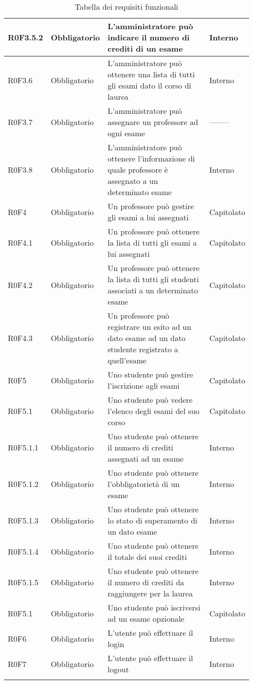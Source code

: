 \documentclass[AnalisiDeiRequisiti.tex]{subfiles}
\begin{document}
\begin{longtable}[H]{|p{2.5cm}|p{2.5cm}|p{5cm}|p{2cm}|}
	R0F3.5.2 & Obbligatorio & L'amministratore può indicare il numero di crediti di un esame & Interno \\ \hline
	R0F3.6 & Obbligatorio & L'amministratore può ottenere una lista di tutti gli esami dato il corso di laurea & Interno \\ \hline
	R0F3.7 & Obbligatorio & L'amministratore può assegnare un professore ad ogni esame & -------- \\ \hline %
	R0F3.8 & Obbligatorio & L'amministratore può ottenere l'informazione di quale professore è assegnato a un determinato esame & Interno \\ \hline
	R0F4 & Obbligatorio & Un professore può gestire gli esami a lui assegnati & Capitolato \\ \hline
	R0F4.1 & Obbligatorio & Un professore può ottenere la lista di tutti gli esami a lui assegnati & Capitolato \\ \hline
	R0F4.2 & Obbligatorio & Un professore può ottenere la lista di tutti gli studenti associati a un determinato esame & Capitolato \\ \hline
	R0F4.3 & Obbligatorio & Un professore può registrare un esito ad un dato esame ad un dato studente registrato a quell'esame & Capitolato \\ \hline
	R0F5 & Obbligatorio & Uno studente può gestire l'iscrizione agli esami & Capitolato \\ \hline
	R0F5.1 & Obbligatorio & Uno studente può vedere l'elenco degli esami del suo corso & Capitolato \\ \hline
	R0F5.1.1 & Obbligatorio & Uno studente può ottenere il numero di crediti assegnati ad un esame & Interno \\ \hline
	R0F5.1.2 & Obbligatorio & Uno studente può ottenere l'obbligatorietà di un esame & Interno \\ \hline
	R0F5.1.3 & Obbligatorio & Uno studente può ottenere lo stato di superamento di un dato esame & Interno \\ \hline
	R0F5.1.4 & Obbligatorio & Uno studente può ottenere il totale dei suoi crediti & Interno \\ \hline
	R0F5.1.5 & Obbligatorio & Uno studente può ottenere il numero di crediti da raggiungere per la laurea & Interno \\ \hline
	R0F5.1 & Obbligatorio & Uno studente può iscriversi ad un esame opzionale & Capitolato \\ \hline
	R0F6 & Obbligatorio & L'utente può effettuare il login & Interno \\ \hline
	R0F7 & Obbligatorio & L'utente può effettuare il logout & Interno \\ \hline
	\caption{Tabella dei requisiti funzionali}
\end{longtable}
\end{document}
